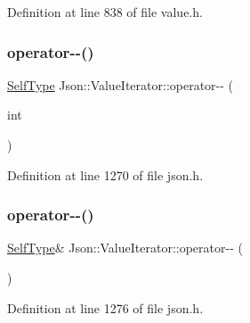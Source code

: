 Definition at line 838 of file value.\+h.

\hypertarget{class_json_1_1_value_iterator_a06d6a29d96caf6af324a53973159e12b}{}\label{class_json_1_1_value_iterator_a06d6a29d96caf6af324a53973159e12b} 
\subsubsection{\texorpdfstring{operator-\/-\/()}{operator--()}\hspace{0.1cm}{\footnotesize\ttfamily [3/4]}}
{\footnotesize\ttfamily \hyperlink{class_json_1_1_value_iterator_base_a9d2a940d03ea06d20d972f41a89149ee}{Self\+Type} Json\+::\+Value\+Iterator\+::operator-\/-\/ (\begin{DoxyParamCaption}\item[{int}]{ }\end{DoxyParamCaption})\hspace{0.3cm}{\ttfamily [inline]}}



Definition at line 1270 of file json.\+h.

\hypertarget{class_json_1_1_value_iterator_a811302a868518a0995a9def955df5720}{}\label{class_json_1_1_value_iterator_a811302a868518a0995a9def955df5720} 
\subsubsection{\texorpdfstring{operator-\/-\/()}{operator--()}\hspace{0.1cm}{\footnotesize\ttfamily [4/4]}}
{\footnotesize\ttfamily \hyperlink{class_json_1_1_value_iterator_base_a9d2a940d03ea06d20d972f41a89149ee}{Self\+Type}\& Json\+::\+Value\+Iterator\+::operator-\/-\/ (\begin{DoxyParamCaption}{ }\end{DoxyParamCaption})\hspace{0.3cm}{\ttfamily [inline]}}



Definition at line 1276 of file json.\+h.

\hypertarget{class_json_1_1_value_iterator_a8dfc1603f92467591d524d0326f35534}{}\label{class_json_1_1_value_iterator_a8dfc1603f92467591d524d0326f35534} 
